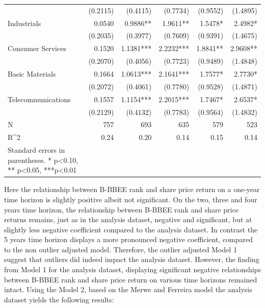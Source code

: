 \begin{table}[t]
{\begin{tabular}{lrrrrr}
                   & (0.2115)  & (0.4115)  & (0.7734)  & (0.9552)  & (1.4895)  \\
Industrials        & 0.0540    & 0.9886**  & 1.9611**  & 1.5478*   & 2.4982*   \\
                   & (0.2035)  & (0.3977)  & (0.7609)  & (0.9391)  & (1.4675)  \\
Consumer Services  & 0.1520    & 1.1381*** & 2.2232*** & 1.8841**  & 2.9608**  \\
                   & (0.2070)  & (0.4056)  & (0.7723)  & (0.9489)  & (1.4848)  \\
Basic Materials    & 0.1664    & 1.0613*** & 2.1641*** & 1.7577*   & 2.7730*   \\
                   & (0.2072)  & (0.4061)  & (0.7780)  & (0.9528)  & (1.4871)  \\
Telecommunications & 0.1557    & 1.1154*** & 2.2015*** & 1.7467*   & 2.6537*   \\
                   & (0.2129)  & (0.4132)  & (0.7783)  & (0.9564)  & (1.4832)  \\
N                  & 757       & 693       & 635       & 579       & 523       \\
R^2                 & 0.24      & 0.20      & 0.14      & 0.15      & 0.14      \\
   \bottomrule
Standard errors in parentheses.
* p<0.10, ** p<0.05, ***p<0.01
\end{tabular}}
\end{table} 
Here the relationship between B-BBEE rank and share price return on a one-year time horizon is slightly positive albeit not significant. On the two, three and four years time horizon, the relationship between B-BBEE rank and share price returns remains, just as in the analysis dataset,  negative and significant, but at slightly less negative coefficient compared to the analysis dataset. In contrast the 5 years time horizon displays a more pronounced negative coefficient, compared to the non outlier adjusted model. Therefore, the outlier adjusted Model 1 suggest that outliers did indeed impact the analysis dataset. However, the finding from Model 1 for the analysis dataset, displaying significant negative relationships between B-BBEE rank and share price return on various time horizons remained intact.
\newpage
Using the Model 2, based on the Merwe and Ferreira model the analysis dataset yields the following results:
